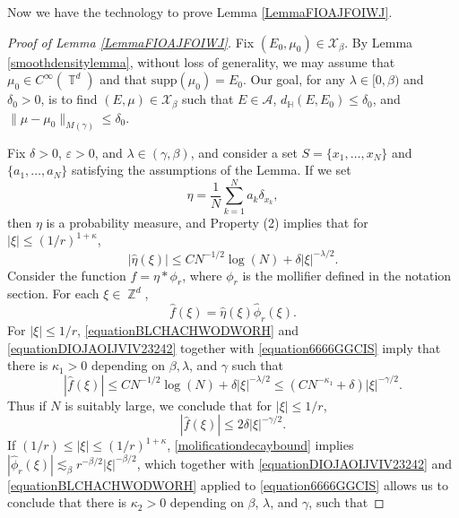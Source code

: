 \documentclass[dvipsnames,letterpaper,12pt]{article}
\numberwithin{equation}{section}
\DeclareMathOperator{\ZZ}{\mathbb{Z}}
\DeclareMathOperator{\TT}{\mathbb{T}}
\numberwithin{theorem}{section}
\begin{document}
Now we have the technology to prove Lemma \ref{LemmaFIOAJFOIWJ}.

\begin{proof}[Proof of Lemma \ref{LemmaFIOAJFOIWJ}]
    Fix $(E_0,\mu_0) \in \mathcal{X}_\beta$. By Lemma \ref{smoothdensitylemma}, without loss of generality, we may assume that $\mu_0 \in C^\infty(\TT^d)$ and that $\text{supp}(\mu_0) = E_0$. Our goal, for any $\lambda \in [0,\beta)$ and $\delta_0 > 0$, is to find $(E,\mu) \in \mathcal{X}_\beta$ such that $E \in \mathcal{A}$, $d_{\mathbb{H}}(E,E_0) \leq \delta_0$, and $\| \mu - \mu_0 \|_{M(\gamma)} \leq \delta_0$.

    Fix $\delta > 0$, $\varepsilon > 0$, and $\lambda \in (\gamma,\beta)$, and consider a set $S = \{ x_1, \dots, x_N \}$ and $\{ a_1, \dots, a_N \}$ satisfying the assumptions of the Lemma. If we set
    \[ \eta = \frac{1}{N} \sum_{k = 1}^N a_k \delta_{x_k}, \]
    then $\eta$ is a probability measure, and Property (2) implies that for $|\xi| \leq (1/r)^{1 + \kappa}$,
    \begin{equation} \label{equationBLCHACHWODWORH}
        |\widehat{\eta}(\xi)| \leq C N^{-1/2} \log(N) + \delta |\xi|^{-\lambda/2}.
    \end{equation}
    Consider the function $f = \eta * \phi_r$, where $\phi_r$ is the mollifier defined in the notation section. For each $\xi \in \ZZ^d$,
    \begin{equation} \label{equation6666GGCIS}
        \widehat{f}(\xi) = \widehat{\eta}(\xi) \widehat{\phi}_r(\xi).
    \end{equation}
    For $|\xi| \leq 1/r$, \eqref{equationBLCHACHWODWORH} and \eqref{equationDIOJAOIJVIV23242} together with \eqref{equation6666GGCIS} imply that there is $\kappa_1 > 0$ depending on $\beta,\lambda$, and $\gamma$ such that
    \begin{equation}
        |\widehat{f}(\xi)| \leq C N^{-1/2} \log(N) + \delta |\xi|^{-\lambda/2} \leq (C N^{-\kappa_1} + \delta) |\xi|^{-\gamma/2}.
    \end{equation}
    Thus if $N$ is suitably large, we conclude that for $|\xi| \leq 1/r$,
    \begin{equation} \label{equationOIJVIOJOIJ21314}
        |\widehat{f}(\xi)| \leq 2 \delta |\xi|^{-\gamma/2}.
    \end{equation}
    If $(1/r) \leq |\xi| \leq (1/r)^{1+\kappa}$, \eqref{molificationdecaybound} implies $|\widehat{\phi}_r(\xi)| \lesssim_\beta r^{-\beta/2} |\xi|^{-\beta/2}$, which together with \eqref{equationDIOJAOIJVIV23242} and \eqref{equationBLCHACHWODWORH} applied to \eqref{equation6666GGCIS} allows us to conclude that there is $\kappa_2 > 0$ depending on $\beta$, $\lambda$, and $\gamma$, such that

\end{proof}
\end{document}
